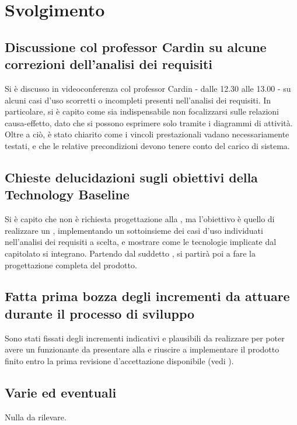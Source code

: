 \newpage
\section*{Svolgimento}

	\subsection*{Discussione col professor Cardin su alcune correzioni dell'analisi dei requisiti}
		Si è discusso in videoconferenza col professor Cardin - dalle 12.30 alle 13.00 - su alcuni casi d'uso scorretti o incompleti presenti nell'analisi dei requisiti. In particolare, si è capito come sia indispensabile non focalizzarsi sulle relazioni causa-effetto, dato che si possono esprimere solo tramite i diagrammi di attività.
		Oltre a ciò, è stato chiarito come i vincoli prestazionali vadano necessariamente testati, e che le relative precondizioni devono tenere conto del carico di sistema.

	\subsection*{Chieste delucidazioni sugli obiettivi della Technology Baseline}
		Si è capito che non è richiesta progettazione alla , ma l'obiettivo è quello di realizzare un , implementando un sottoinsieme dei casi d'uso individuati nell'analisi dei requisiti a scelta, e mostrare come le tecnologie implicate dal capitolato si integrano. Partendo dal suddetto , si partirà poi a fare la progettazione completa del prodotto.

	\subsection*{Fatta prima bozza degli incrementi da attuare durante il processo di sviluppo}
		Sono stati fissati degli incrementi indicativi e plausibili da realizzare per poter
		avere un  funzionante da presentare alla  e riuscire a implementare il prodotto finito entro la prima revisione d'accettazione disponibile (vedi ).

	\subsection*{Varie ed eventuali}
		Nulla da rilevare.